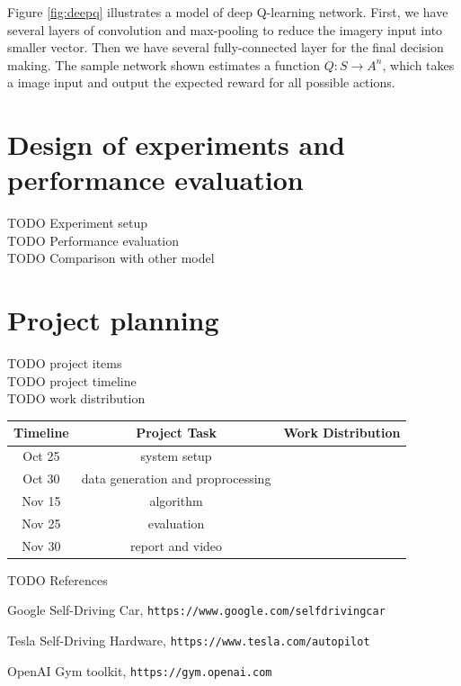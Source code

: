 \documentclass[a4paper]{article}
\begin{document}
Figure \ref{fig:deepq} illustrates a model of deep Q-learning network. First, we have several layers of convolution and max-pooling to reduce the imagery input into smaller vector. Then we have several fully-connected layer for the final decision making. The sample network shown estimates a function $Q : S \rightarrow A^n$, which takes a image input and output the expected reward for all possible actions.

\section{Design of experiments and performance evaluation}

TODO Experiment setup\\
TODO Performance evaluation\\
TODO Comparison with other model\\

\section {Project planning}

TODO project items\\
TODO project timeline\\
TODO work distribution\\

\begin{center}
    \begin{tabular}{ | c | c | c | } 
        \hline
        Timeline & Project Task & Work Distribution   \\ 
        \hline
        Oct 25   & system setup &   \\ 
        \hline
        Oct 30   & data generation and proprocessing &   \\ 
        \hline
        Nov 15   & algorithm  &   \\ 
        \hline
        Nov 25   & evaluation  &   \\ 
        \hline
        Nov 30   & report and video  &   \\ 
        \hline
    \end{tabular}
\end{center}


TODO References\\


\begin{thebibliography}{9}
  Google Self-Driving Car, \texttt{https://www.google.com/selfdrivingcar}

  Tesla Self-Driving Hardware, \texttt{https://www.tesla.com/autopilot}

  OpenAI Gym toolkit, \texttt{https://gym.openai.com}

\end{thebibliography}
\end{document}
